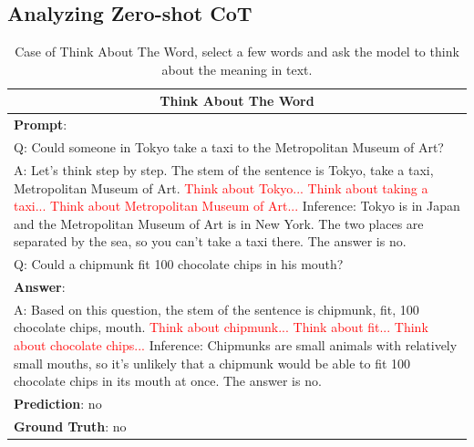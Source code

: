 \documentclass[11pt]{article}
\begin{document}
\phantom{Invisible Text}
\vspace{-\baselineskip}

\subsection{Analyzing Zero-shot CoT}

\begin{table}[t]
\small
  
\caption{Case of Think About The Word, select a few words and ask the model to think about the meaning in text.}
  \label{Think}
  
\begin{tabularx}{\textwidth}{X}
    \toprule
    \multicolumn{1}{c}{\textbf{Think About The Word}} \\
    \midrule
    \textbf{Prompt}: \\
    Q: Could someone in Tokyo take a taxi to the Metropolitan Museum of Art?\\
    A: Let's think step by step. The stem of the sentence is Tokyo, take a taxi, Metropolitan Museum of Art. \textcolor{red}{Think about Tokyo... Think about taking a taxi... Think about Metropolitan Museum of Art...} Inference: Tokyo is in Japan and the Metropolitan Museum of Art is in New York. The two places are separated by the sea, so you can't take a taxi there. The answer is no. \\
    \midrule
    Q: Could a chipmunk fit 100 chocolate chips in his mouth?\\
    \textbf{Answer}:\\
    A: Based on this question, the stem of the sentence is chipmunk, fit, 100 chocolate chips, mouth. \textcolor{red}{Think about chipmunk... Think about fit... Think about chocolate chips...} Inference: Chipmunks are small animals with relatively small mouths, so it's unlikely that a chipmunk would be able to fit 100 chocolate chips in its mouth at once. The answer is no.\\
    \textbf{Prediction}: no\\
    \textbf{Ground Truth}: no\\
    \bottomrule
  \end{tabularx}

%

\end{table}
\end{document}
